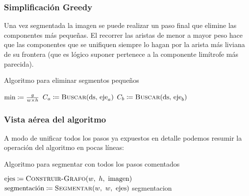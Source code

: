 \subsubsection{Simplificación Greedy}

Una vez segmentada la imagen se puede realizar un paso final que elimine las
componentes más pequeñas. El recorrer las aristas de menor a mayor peso hace
que las componentes que se unifiquen siempre lo hagan por la arista más liviana
de su frontera (que es lógico suponer pertenece a la componente limítrofe más
parecida).

\begin{algorithm}[H]
\caption{Algoritmo para eliminar segmentos pequeños}
\begin{algorithmic}[1]
\Statex{}
	\State{} $\text{min} \coloneqq \frac{g}{w \times h}$
			\State{} $C_a \is \Call{Buscar}{\text{ds, eje}_a}$
			\State{} $C_b \is \Call{Buscar}{\text{ds, eje}_b}$
				\State{} 
			\EndIf{}
		\EndIf{}
	\EndFor{}
\EndFunction{}
\end{algorithmic}
\end{algorithm}

\subsubsection{Vista aérea del algoritmo}

A modo de unificar todos los pasos ya expuestos en detalle podemos resumir la
operación del algoritmo en pocas líneas:

\begin{algorithm}[H]
\caption{Algoritmo para segmentar con todos los pasos comentados}
\begin{algorithmic}[1]
\Statex{}
	\State{} 
	\State{} $\text{ejes} \is \Call{Construir-Grafo}{w,\ h,\ \text{imagen}}$
	\State{} 
	\State{} $\text{segmentación} \is \Call{Segmentar}{w,\ w,\ \text{ejes}}$
	\State{} 
	\State{} \Return{} segmentacion
\EndFunction{}
\end{algorithmic}
\end{algorithm}
